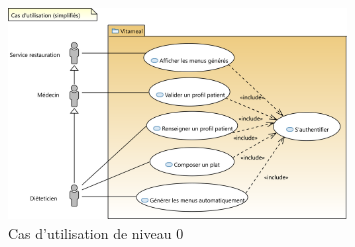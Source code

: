 \begin{figure}[H]
\label{UCGEN}
  \centering
      \includegraphics[width=0.8\textwidth]{../CasDUtilisations/uc_principal.png}
\caption{Cas d'utilisation de niveau 0}
\end{figure}